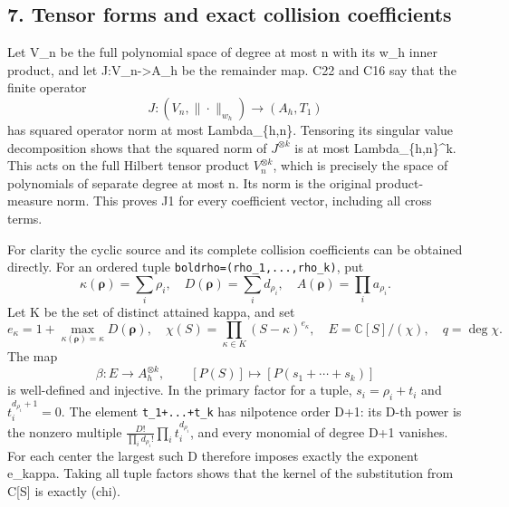 \subsection{7. Tensor forms and exact collision coefficients}\label{mrcoerc:tensor-forms-and-exact-collision-coefficients}

Let V\_n be the full polynomial space of degree at most n with its w\_h inner product, and let J:V\_n-\textgreater A\_h be the remainder map. C22 and C16 say that the finite operator \[
J:(V_n,\|\cdot\|_{w_h})\longrightarrow(A_h,T_1)
\] has squared operator norm at most Lambda\_\{h,n\}. Tensoring its singular value decomposition shows that the squared norm of \(J^{\otimes k}\) is at most Lambda\_\{h,n\}\^{}k. This acts on the full Hilbert tensor product \(V_n^{\otimes k}\), which is precisely the space of polynomials of separate degree at most n. Its norm is the original product-measure norm. This proves J1 for every coefficient vector, including all cross terms.

For clarity the cyclic source and its complete collision coefficients can be obtained directly. For an ordered tuple \texttt{boldrho=(rho\_1,...,rho\_k)}, put \[
\kappa(\boldsymbol\rho)=\sum_i\rho_i,\quad
D(\boldsymbol\rho)=\sum_i d_{\rho_i},\quad
A(\boldsymbol\rho)=\prod_i a_{\rho_i}.
\] Let K be the set of distinct attained kappa, and set \[
e_\kappa=1+\max_{\kappa(\boldsymbol\rho)=\kappa}D(\boldsymbol\rho),
\quad \chi(S)=\prod_{\kappa\in K}(S-\kappa)^{e_\kappa},
\quad E=\mathbb C[S]/(\chi),\quad q=\deg\chi.
\] The map \[
\beta:E\longrightarrow A_h^{\otimes k},\qquad
[P(S)]\longmapsto[P(s_1+\cdots+s_k)]
\tag{C23}
\] is well-defined and injective. In the primary factor for a tuple, \(s_i=\rho_i+t_i\) and \(t_i^{d_{\rho_i}+1}=0\). The element \texttt{t\_1+...+t\_k} has nilpotence order D+1: its D-th power is the nonzero multiple \(\displaystyle\frac{D!}{\prod_i d_{\rho_i}!}\prod_i t_i^{d_{\rho_i}}\), and every monomial of degree D+1 vanishes. For each center the largest such D therefore imposes exactly the exponent e\_kappa. Taking all tuple factors shows that the kernel of the substitution from C{[}S{]} is exactly (chi).

